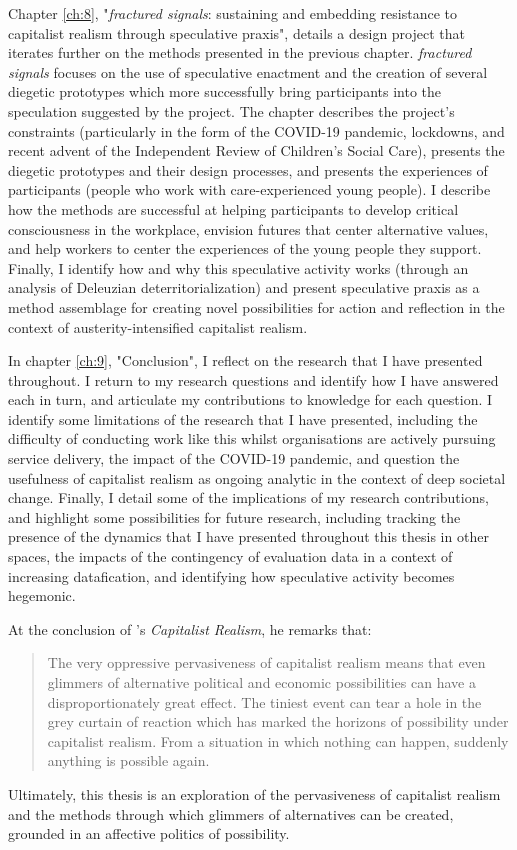 Chapter \ref{ch:8}, "\textit{fractured signals}: sustaining and embedding resistance to capitalist realism through speculative praxis", details a design project that iterates further on the methods presented in the previous chapter. \textit{fractured signals} focuses on the use of speculative enactment and the creation of several diegetic prototypes which more successfully bring participants into the speculation suggested by the project. The chapter describes the project's constraints (particularly in the form of the COVID-19 pandemic, lockdowns, and recent advent of the Independent Review of Children's Social Care), presents the diegetic prototypes and their design processes, and presents the experiences of participants (people who work with care-experienced young people). I describe how the methods are successful at helping participants to develop critical consciousness in the workplace, envision futures that center alternative values, and help workers to center the experiences of the young people they support. Finally, I identify how and why this speculative activity works (through an analysis of Deleuzian deterritorialization) and present speculative praxis as a method assemblage for creating novel possibilities for action and reflection in the context of austerity-intensified capitalist realism.

In chapter \ref{ch:9}, "Conclusion", I reflect on the research that I have presented throughout. I return to my research questions and identify how I have answered each in turn, and articulate my contributions to knowledge for each question. I identify some limitations of the research that I have presented, including the difficulty of conducting work like this whilst organisations are actively pursuing service delivery, the impact of the COVID-19 pandemic, and question the usefulness of capitalist realism as ongoing analytic in the context of deep societal change. Finally, I detail some of the implications of my research contributions, and highlight some possibilities for future research, including tracking the presence of the dynamics that I have presented throughout this thesis in other spaces, the impacts of the contingency of evaluation data in a context of increasing datafication, and identifying how speculative activity becomes hegemonic. 

At the conclusion of \citet[pp. 80–81]{fisher_capitalist_2009}'s \textit{Capitalist Realism}, he remarks that:
\begin{quote}
The very oppressive pervasiveness of capitalist realism means that even glimmers of alternative political and economic possibilities can have a disproportionately great effect. The tiniest event can tear a hole in the grey curtain of reaction which has marked the horizons of possibility under capitalist realism. From a situation in which nothing can happen, suddenly anything is possible again.
\end{quote}
Ultimately, this thesis is an exploration of the pervasiveness of capitalist realism and the methods through which glimmers of alternatives can be created, grounded in an affective politics of possibility. 

